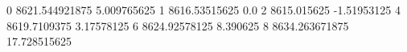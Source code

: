0 8621.544921875 5.009765625
1 8616.53515625 0.0
2 8615.015625 -1.51953125
4 8619.7109375 3.17578125
6 8624.92578125 8.390625
8 8634.263671875 17.728515625
